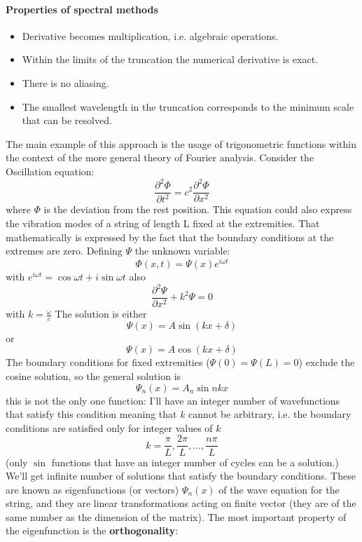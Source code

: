 \paragraph{Properties of spectral methods}
\begin{itemize}
    \item Derivative becomes multiplication, i.e. algebraic operations.
    \item Within the limits of the truncation the numerical derivative is exact.
    \item There is no aliasing. 
    \item The smallest wavelength in the truncation corresponds to the minimum scale that can be resolved.
\end{itemize}
The main example of this approach is the usage of trigonometric functions within the context of the more general theory of Fourier analysis. Consider the Oscillation equation:
\begin{equation}\label{eq:oscillation}
    \frac{\partial^2\Phi}{\partial t^2}=c^2\frac{\partial^2\Phi}{\partial x^2}
\end{equation}
where $\Phi$ is the deviation from the rest position. 
This equation could also express the vibration modes of a string of length L fixed at the extremities. That mathematically is expressed by the fact that the boundary conditions at the extremes are zero. Defining $\Psi$ the unknown variable: 
\begin{equation}
    \Phi(x,t)=\Psi(x)e^{i\omega t}
\end{equation}
with $e^{i\omega t}=\cos \omega t+i\sin\omega t$
also 
\begin{equation}
    \frac{\partial^2\Psi}{\partial x^2}+k^2\Psi=0
\end{equation} with $k=\frac{\omega}{c}$
The solution is either $$\Psi(x)=A\sin(kx+\delta)$$
or $$\Psi(x)=A\cos(kx+\delta)$$
The boundary conditions for fixed extremities ($\Psi(0)=\Psi(L)=0$) exclude the cosine solution, so the general solution is 
\begin{equation}\label{psin}
    \Psi_n(x)=A_n\sin{nk x}
\end{equation}
this is not the only one function: I'll have an integer number of wavefunctions that satisfy this condition meaning that $k$ cannot be arbitrary, i.e. the boundary conditions are satisfied only for integer values of $k$
$$k=\frac{\pi}{L}, \frac{2\pi}{L}, \dots, \frac{n\pi}{L}$$
(only $\sin$ functions that have an integer number of cycles can be a solution.)  We'll get infinite number of solutions that satisfy the boundary conditions. These are known as eigenfunctions (or vectors) $\Psi_n(x)$ of the wave equation for the string, and they are linear transformations acting on finite vector (they are of the same number as the dimension of the matrix). The most important property of the eigenfunction is the \textbf{orthogonality}:
